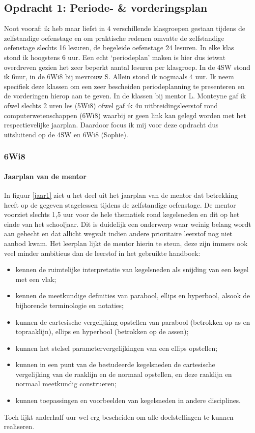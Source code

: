 \documentclass[a4paper,11pt]{article}
\theoremstyle{definition}
\begin{document}
\subsection{Opdracht 1: Periode- \& vorderingsplan}
Noot vooraf: ik heb maar liefst in 4 verschillende klasgroepen gestaan tijdens 
de zelfstandige oefenstage en om praktische redenen omvatte de zelfstandige 
oefenstage slechts 16 lesuren, de begeleide oefenstage 24 lesuren. In elke klas stond ik hoogstens 6 uur. Een echt 
`periodeplan' maken is hier dus ietwat overdreven gezien het zeer beperkt aantal lesuren per klasgroep.
 In de 4SW stond ik 6uur, in 
de 6Wi8 bij mevrouw S. Allein stond ik nogmaals 4 uur. Ik neem specifiek deze 
klassen om een zeer bescheiden periodeplanning te presenteren en de vorderingen 
hierop aan te geven. In de klassen bij mentor L. Monteyne gaf ik ofwel slechts 2 
uren les (5Wi8) ofwel gaf ik 4u uitbreidingsleerstof rond computerwetenschappen (6Wi8) 
waarbij er geen link kan gelegd worden met het respectievelijke jaarplan. 
Daardoor focus ik mij voor deze opdracht dus uitsluitend op de 4SW en 6Wi8 
(Sophie).
\subsubsection{6Wi8}
\paragraph{Jaarplan van de mentor}
In figuur \ref{jaar1} ziet u het deel uit het jaarplan van de mentor dat 
betrekking heeft op de gegeven stagelessen tijdens de zelfstandige oefenstage. 
De mentor voorziet slechts 1,5 uur voor de hele thematiek rond kegelsneden en 
dit op het einde van het schooljaar. Dit is duidelijk een onderwerp waar weinig 
belang wordt aan gehecht en dat allicht wegvalt indien andere prioritaire 
leerstof nog niet aanbod kwam. Het leerplan lijkt de mentor hierin te steun, deze zijn immers ook veel minder
ambitieus dan de leerstof in het gebruikte handboek:
\begin{itemize}
  \item kennen de ruimtelijke interpretatie van kegelsneden als snijding van een kegel met
een vlak;
\item kennen de meetkundige definities van parabool, ellips en hyperbool, alsook de bijhorende terminologie en notaties;
\item kunnen de cartesische vergelijking opstellen van parabool (betrokken op as en
topraaklijn), ellips en hyperbool (betrokken op de assen);
\item kunnen het stelsel parametervergelijkingen van een ellips opstellen;
\item kunnen in een punt van de bestudeerde kegelsneden de cartesische vergelijking van
de raaklijn en de normaal opstellen, en deze raaklijn en normaal meetkundig construeren;
\item kunnen toepassingen en voorbeelden van kegelsneden in andere disciplines.
\end{itemize}
Toch lijkt anderhalf uur wel erg bescheiden om alle doelstellingen te kunnen 
realiseren. 
\end{document}
